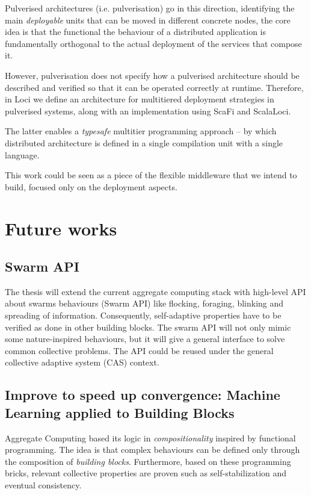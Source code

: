 \documentclass[11pt]{article}
\begin{document}
Pulverised architectures (i.e. pulverisation) go in this direction, identifying the main \textit{deployable} units that can be moved in different concrete nodes, the core idea is that the functional
the behaviour of a distributed application is fundamentally orthogonal to the actual deployment of the services that compose it.

However, pulverisation does not specify how a pulverised architecture should
be described and verified so that it can be operated correctly
at runtime.
Therefore, in \scafiweb Loci we define an architecture for multitiered deployment strategies in pulverised systems, along with an implementation using ScaFi and ScalaLoci.

The latter enables a \textit{typesafe} multitier programming approach -- by which distributed architecture is defined
in a single compilation unit with a single language.

This work could be seen as a piece of the flexible middleware that we intend to build, focused only on the deployment aspects.

\section{Future works}\label{future}

\subsection{Swarm API}
The thesis will extend the current aggregate computing stack with high-level API about swarms behaviours (Swarm API) like flocking, foraging, blinking and spreading of information.  Consequently, self-adaptive properties have to be verified as done in other building blocks.  The swarm API will not only mimic some nature-inspired behaviours, but it will give a general interface to solve common collective problems. The API could be reused under the general collective adaptive system (CAS) context.
\subsection{Improve to speed up convergence: Machine Learning applied to Building Blocks}
Aggregate Computing based its logic in \textit{compositionality} inspired by functional programming. The idea is that complex behaviours can be defined only through the composition of \emph{building blocks}. Furthermore, based on these programming bricks, relevant collective properties are proven such as self-stabilization and eventual consistency. 
\end{document}
